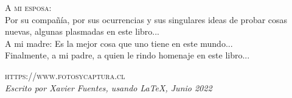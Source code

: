 \noindent \textsc{A mi esposa:}\\

\noindent Por su compañía, por sus ocurrencias y sus singulares ideas de probar cosas nuevas, algunas plasmadas en este libro...\\

\noindent A mi madre: Es la mejor cosa que uno tiene en este mundo...\\ 

\noindent Finalmente, a mi padre, a quien le rindo homenaje en este libro...

\noindent \textsc{https://www.fotosycaptura.cl}\\ %

\noindent \textit{Escrito por Xavier Fuentes, usando \LaTeX, Junio 2022}